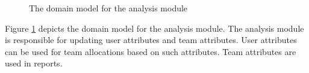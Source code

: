 \begin{figure}[htb]
\begin{center}
\end{center}
\caption{ The domain model for the analysis module \label{fig:analysis_domainModel}}
\end{figure}

Figure \ref{fig:analysis_domainModel} depicts the domain model for the analysis module. The analysis module is responsible for updating user attributes and team attributes. User attributes can be used for team allocations based on such attributes. Team attributes are used in reports.



